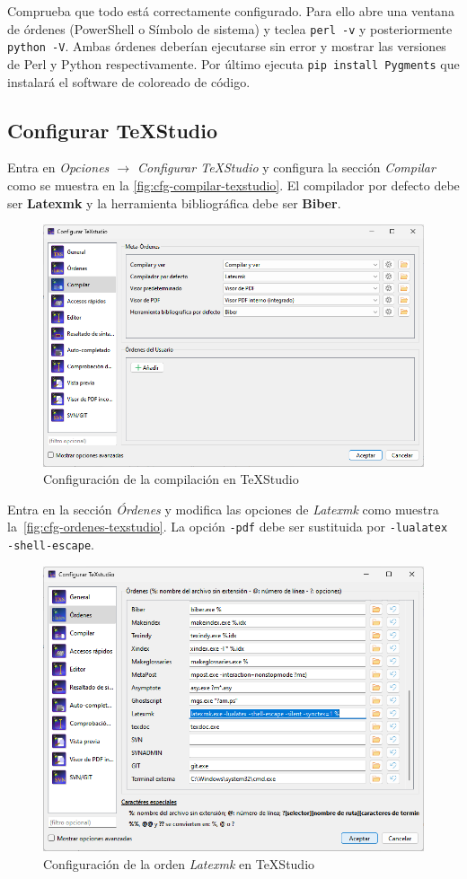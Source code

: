 Comprueba que todo está correctamente configurado.  Para ello abre una ventana de órdenes (PowerShell o Símbolo de sistema) y teclea \texttt{perl -v} y posteriormente \texttt{python -V}. Ambas órdenes deberían ejecutarse sin error y mostrar las versiones de Perl y Python respectivamente. Por último ejecuta \texttt{pip install Pygments} que instalará el software de coloreado de código.

\subsection{Configurar TeXStudio}

Entra en \emph{Opciones $\rightarrow$ Configurar TeXStudio} y configura la sección \emph{Compilar} como se muestra en la \autoref{fig:cfg-compilar-texstudio}. El compilador por defecto debe ser \textbf{Latexmk} y la herramienta bibliográfica debe ser \textbf{Biber}.

\begin{figure}
    \centering
    \includegraphics[width=.7\textwidth]{fig/cfg-texstudio-compilar.png}
    \caption{Configuración de la compilación en TeXStudio}
    \label{fig:cfg-compilar-texstudio}
\end{figure}

Entra en la sección \emph{Órdenes} y modifica las opciones de \emph{Latexmk} como muestra la~\autoref{fig:cfg-ordenes-texstudio}. La opción \texttt{-pdf} debe ser sustituida por \texttt{-lualatex -shell-escape}.

\begin{figure}
    \centering
    \includegraphics[width=.7\textwidth]{fig/cfg-texstudio-ordenes.png}
    \caption{Configuración de la orden \emph{Latexmk} en TeXStudio}
    \label{fig:cfg-ordenes-texstudio}
\end{figure}
